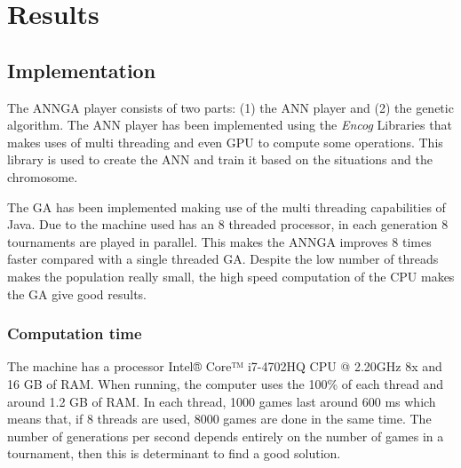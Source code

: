 \section{Results} %
\label{sec:results}
	\subsection{Implementation} %
	\label{sub:implementation}
	The ANNGA player consists of two parts: (1) the ANN player and (2) the genetic algorithm. 
	The ANN player has been implemented using the \emph{Encog} Libraries \cite{encog} that makes uses of multi threading and even GPU to compute some operations.
	This library is used to create the ANN and train it based on the situations and the chromosome.

	The GA has been implemented making use of the multi threading capabilities of Java. 
	Due to the machine used has an 8 threaded processor, in each generation 8 tournaments are played in parallel.
	This makes the ANNGA improves 8 times faster compared with a single threaded GA.
	Despite the low number of threads makes the population really small, the high speed computation of the CPU makes the GA give good results.

	\subsubsection{Computation time} %
	\label{ssub:computation_time}
		The machine has a processor Intel® Core™ i7-4702HQ CPU @ 2.20GHz 8x and 16 GB of RAM.
		When running, the computer uses the 100\% of each thread and around 1.2 GB of RAM.
		In each thread, 1000 games last around 600 ms which means that, if 8 threads are used, 8000 games are done in the same time. 	
		The number of generations per second depends entirely on the number of games in a tournament, then this is determinant to find a good solution.

